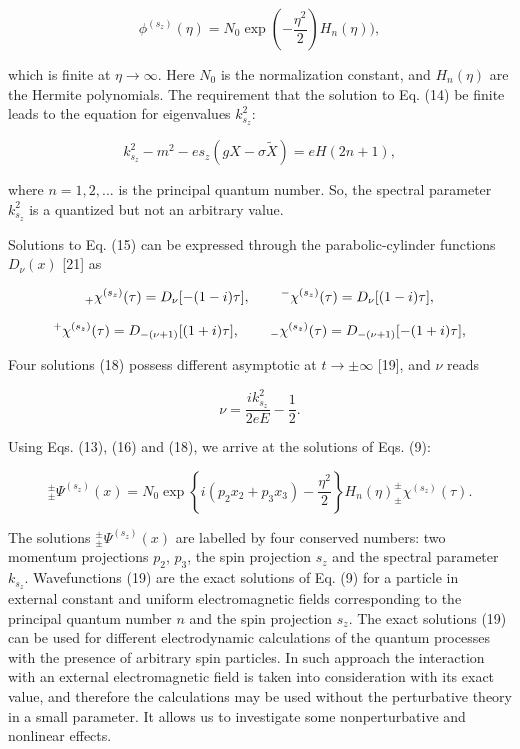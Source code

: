 \documentclass[a4paper,12pt]{article}
\begin{document}
\begin{equation}
\phi ^{(s_z)}(\eta )=N_0\exp \left( -\frac{\eta ^2}2\right) H_n(\eta )),
\label{16}
\end{equation}

which is finite at $\eta \rightarrow \infty $. Here $N_0$ is the
normalization constant, and $H_n(\eta )$ are the Hermite polynomials. The
requirement that the solution to Eq. (14) be finite leads to the equation
for eigenvalues $k_{s_z}^2$:

\begin{equation}
k_{s_z}^2-m^2-es_z\left( gX-\sigma \widetilde{X}\right) =eH(2n+1),
\label{17}
\end{equation}

where $n=1,2,...$ is the principal quantum number. So, the spectral
parameter $k_{s_z}^2$ is a quantized but not an arbitrary value.

Solutions to Eq. (15) can be expressed through the parabolic-cylinder
functions $D_\nu (x)$ [21] as

\[
_{+}\chi ^{(s_z)}(\tau )=D_\nu [-(1-i)\tau ],\hspace{0.3in}^{-}\chi
^{(s_z)}(\tau )=D_\nu [(1-i)\tau ],
\]
\vspace{-8mm}
\begin{equation}  \label{18}
\end{equation}
\vspace{-8mm}
\[
^{+}\chi ^{(s_z)}(\tau )=D_{-(\nu+1)}[(1+i)\tau ],\hspace{0.3in}_{-}\chi
^{(s_z)}(\tau )=D_{-(\nu+1)}[-(1+i)\tau ],
\]

Four solutions (18) possess different asymptotic at $t\rightarrow \pm \infty
$ [19], and $\nu $ reads

\[
\nu =\frac{ik_{s_z}^2}{2eE}-\frac 12.
\]

Using Eqs. (13), (16) and (18), we arrive at the solutions of Eqs. (9):

\begin{equation}
_{\pm }^{\pm }\Psi ^{(s_z)}(x)=N_0\exp \left\{ i(p_2x_2+p_3x_3)-\frac{\eta
^2 }2\right\} H_n(\eta )_{\pm }^{\pm }\chi ^{(s_z)}(\tau ).  \label{19}
\end{equation}

The solutions $_{\pm }^{\pm }\Psi ^{(s_z)}(x)$ are labelled by four
conserved numbers: two momentum projections $p_2$, $p_3$, the spin
projection $s_z$ and the spectral parameter $k_{s_z}$. Wavefunctions (19)
are the exact solutions of Eq. (9) for a particle in external constant and
uniform electromagnetic fields corresponding to the principal quantum number
$n$ and the spin projection $s_z$. The exact solutions (19) can be used for
different electrodynamic calculations of the quantum processes with the
presence of arbitrary spin particles. In such approach the interaction with
an external electromagnetic field is taken into consideration with its exact
value, and therefore the calculations may be used without the perturbative
theory in a small parameter. It allows us to investigate some
nonperturbative and nonlinear effects.
\end{document}
